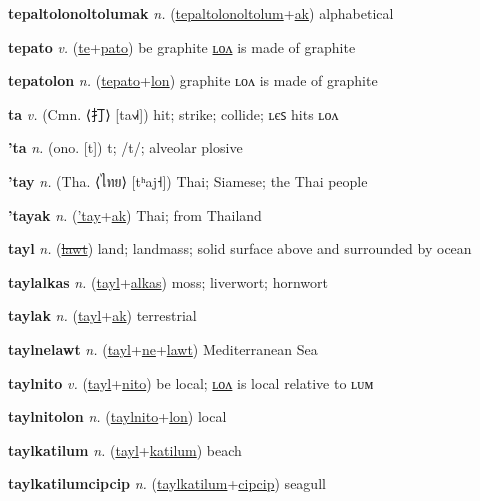 \textbf{\hypertarget{tepaltolonoltolumak}{tepaltolonoltolumak}} \textit{n.} (\hyperlink{tepaltolonoltolum}{tepaltolonoltolum}+\allowbreak \hyperlink{ak}{ak})
alphabetical

\textbf{\hypertarget{tepato}{tepato}} \textit{v.} (\hyperlink{te}{te}+\allowbreak \hyperlink{pato}{pato})
be graphite \hyperlink{tepatolon}{ʟᴏᴧ} is made of graphite

\textbf{\hypertarget{tepatolon}{tepatolon}} \textit{n.} (\hyperlink{tepato}{tepato}+\allowbreak \hyperlink{lon}{lon})
graphite ʟᴏᴧ is made of graphite

\textbf{\hypertarget{ta}{ta}} \textit{v.} (Cmn. ⟨{\chinese{}打}⟩ [ta˧˩˧])
hit; strike; collide; ʟєꜱ hits ʟᴏᴧ

\textbf{\hypertarget{'ta}{'ta}} \textit{n.} (ono. [t])
t; /t/; alveolar plosive

\textbf{\hypertarget{'tay}{'tay}} \textit{n.} (Tha. ⟨{\thai{}ไทย}⟩ [tʰaj˧])
Thai; Siamese; the Thai people

\textbf{\hypertarget{'tayak}{'tayak}} \textit{n.} (\hyperlink{'tay}{'tay}+\allowbreak \hyperlink{ak}{ak})
Thai; from Thailand

\textbf{\hypertarget{tayl}{tayl}} \textit{n.} (\hyperlink{lawt}{\sout{lawt}})
land; landmass; solid surface above and surrounded by ocean

\textbf{\hypertarget{taylalkas}{taylalkas}} \textit{n.} (\hyperlink{tayl}{tayl}+\allowbreak \hyperlink{alkas}{alkas})
moss; liverwort; hornwort

\textbf{\hypertarget{taylak}{taylak}} \textit{n.} (\hyperlink{tayl}{tayl}+\allowbreak \hyperlink{ak}{ak})
terrestrial

\textbf{\hypertarget{taylnelawt}{taylnelawt}} \textit{n.} (\hyperlink{tayl}{tayl}+\allowbreak \hyperlink{ne}{ne}+\allowbreak \hyperlink{lawt}{lawt})
Mediterranean Sea

\textbf{\hypertarget{taylnito}{taylnito}} \textit{v.} (\hyperlink{tayl}{tayl}+\allowbreak \hyperlink{nito}{nito})
be local; \hyperlink{taylnitolon}{ʟᴏᴧ} is local relative to ʟᴜᴍ

\textbf{\hypertarget{taylnitolon}{taylnitolon}} \textit{n.} (\hyperlink{taylnito}{taylnito}+\allowbreak \hyperlink{lon}{lon})
local

\textbf{\hypertarget{taylkatilum}{taylkatilum}} \textit{n.} (\hyperlink{tayl}{tayl}+\allowbreak \hyperlink{katilum}{katilum})
beach

\textbf{\hypertarget{taylkatilumcipcip}{taylkatilumcipcip}} \textit{n.} (\hyperlink{taylkatilum}{taylkatilum}+\allowbreak \hyperlink{cipcip}{cipcip})
seagull

